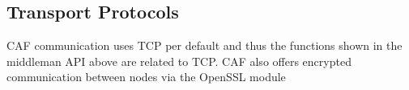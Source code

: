 \subsection{Transport Protocols \experimental}
\label{transport-protocols}

CAF communication uses TCP per default and thus the functions shown in the
middleman API above are related to TCP. CAF also offers encrypted communication
between nodes via the OpenSSL module 

